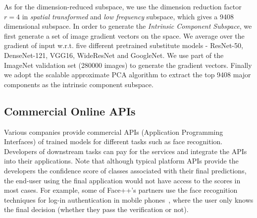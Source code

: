 As for the dimension-reduced subspace, we use the dimension reduction factor $r=4$ 
in \emph{spatial transformed} and \emph{low frequency} subspace, which gives a 9408 dimensional subspace.
In order to generate the \emph{Intrinsic Component Subspace}, we first generate a set of image gradient vectors on the space. We average over the gradient of input w.r.t. five different pretrained substitute models - ResNet-50\cite{he2016deep}, DenseNet-121\cite{huang2017densely}, VGG16\cite{simonyan2014very}, WideResNet\cite{zagoruyko2016wide} and GoogleNet\cite{szegedy2015going}. We use part of the ImageNet validation set (280000 images) to generate the gradient vectors. Finally we adopt the scalable approximate PCA algorithm\cite{halko2011finding} to extract the top 9408 major components as the intrinsic component subspace.



\subsection{Commercial Online APIs}
Various companies provide commercial APIs (Application Programming Interfaces) of trained models for different tasks such as face recognition. Developers of downstream tasks can pay for the services and integrate the APIs into their applications. Note that although typical platform APIs provide the developers the confidence score of classes associated with their final predictions, the end-user using the final application would not have access to the scores in most cases. For example, some of Face++'s partners use the face recognition techniques for log-in authentication in mobile phones~\cite{facepp-partner}, where the user only knows the final decision (whether they pass the verification or not).

